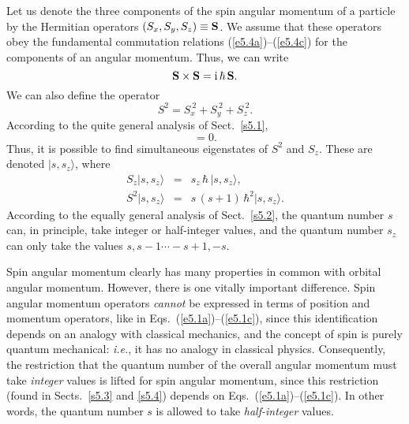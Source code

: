 Let us denote the three components of the spin angular momentum of a
particle by the Hermitian operators
 $(S_x, S_y, S_z)\equiv {\bf S}$. We assume that these 
operators obey the fundamental commutation relations (\ref{e5.4a})--(\ref{e5.4c}) for the components
of an angular momentum. Thus, we can write
\begin{equation}\label{e5.100}
{\bf S} \times {\bf S} = {\rm i}\,\hbar \, {\bf S}.
\end{equation}
We can also define the operator
\begin{equation}
S^2 = S_x^{~2}+S_y^{~2} + S_z^{~2}.
\end{equation}
According to the quite general analysis of Sect.~\ref{s5.1},
\begin{equation}
[{\bf S}, S^2] = 0.
\end{equation}
Thus, it is possible to find simultaneous eigenstates of $S^2$ and $S_z$. 
These are denoted $|s, s_z\rangle$, where
\begin{eqnarray}
S_z |s, s_z\rangle &=& s_z \,\hbar \,|s, s_z\rangle,\\[0.5ex]
S^2 |s, s_z\rangle &=& s\,(s+1)\,\hbar^2 |s, s_z\rangle.
\end{eqnarray}
According to the equally general
analysis of Sect.~\ref{s5.2}, the quantum number $s$ can, in principle, 
take integer or half-integer values,
and the quantum number $s_z$ can only take the values $s, s-1 \cdots -s+1, -s$. 

Spin angular momentum clearly has many properties in common with
orbital angular momentum. However, there is one vitally important difference. 
Spin angular momentum operators {\em cannot} be expressed  in terms of
position and momentum operators, like  in Eqs.~(\ref{e5.1a})--(\ref{e5.1c}), since this 
identification depends on an analogy with classical mechanics, and the concept
of spin is purely quantum mechanical: {\em i.e.}, it has no analogy in classical physics. 
Consequently, the restriction that the quantum number of the overall angular
momentum must take {\em integer} values is lifted for spin angular momentum,
since this restriction (found in Sects.~\ref{s5.3} and \ref{s5.4}) depends on Eqs.~(\ref{e5.1a})--(\ref{e5.1c}).
In other words, the quantum number $s$ is allowed to take {\em half-integer} values.

